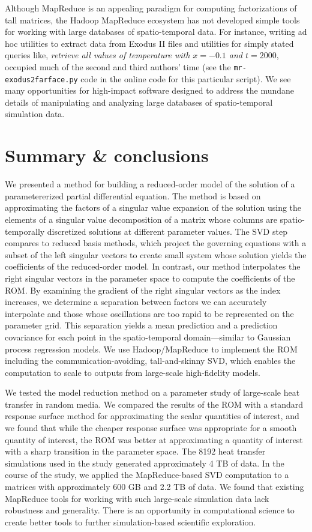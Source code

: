 \documentclass[final]{siamltex}
\begin{document}
Although MapReduce is an appealing paradigm for
computing factorizations of tall matrices, the Hadoop
MapReduce ecosystem has not developed simple tools for working with
large databases of spatio-temporal data.  For instance, writing ad hoc
utilities to extract data from Exodus II files and utilities for
simply stated queries like, \emph{retrieve all values of temperature
  with $x=-0.1$ and $t=2000$}, occupied much of the second and third
authors' time (see the \texttt{mr-exodus2farface.py} code in the
online code for this particular script).  We see many opportunities
for high-impact software designed to address the mundane details of
manipulating and analyzing large databases of spatio-temporal
simulation data.

\section{Summary \& conclusions}
\label{sec:conclusion}

We presented a method for building a reduced-order model of the
solution of a parametererized partial differential equation. The
method is based on approximating the factors of a singular value
expansion of the solution using the elements of a singular value
decomposition of a matrix whose columns are spatio-temporally
discretized solutions at different parameter values. The SVD step
compares to reduced basis methods, which project the governing
equations with a subset of the left singular vectors to create small
system whose solution yields the coefficients of the reduced-order
model. In contrast, our method interpolates the right singular vectors
in the parameter space to compute the coefficients of the ROM.  By
examining the gradient of the right singular vectors as the index
increases, we determine a separation between factors we can accurately
interpolate and those whose oscillations are too rapid to be
represented on the parameter grid. This separation yields a mean
prediction and a prediction covariance for each point in the
spatio-temporal domain---similar to Gaussian process regression
models.  We use Hadoop/MapReduce to implement the ROM including the
communication-avoiding, tall-and-skinny SVD, which enables the
computation to scale to outputs from large-scale high-fidelity models.

We tested the model reduction method on a parameter study of
large-scale heat transfer in random media. We compared the results of
the ROM with a standard response surface method for approximating the
scalar quantities of interest, and we found that while the cheaper
response surface was appropriate for a smooth quantity of interest,
the ROM was better at approximating a quantity of interest with a
sharp transition in the parameter space. The 8192 heat transfer
simulations used in the study generated approximately 4 TB of data. In
the course of the study, we applied the MapReduce-based SVD
computation to a matrices with approximately 600 GB and 2.2 TB of
data. We found that existing MapReduce tools for working with such
large-scale simulation data lack robustness and generality. There is
an opportunity in computational science to create better tools to
further simulation-based scientific exploration.
\end{document}
